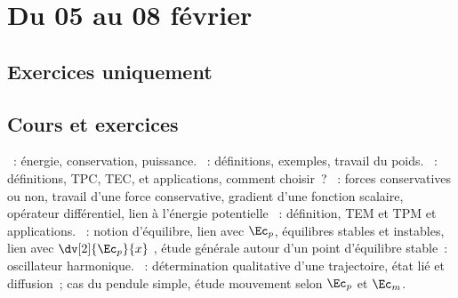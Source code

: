 \documentclass[a4paper, 12pt, final, garamond]{book}
\begin{document}
\setcounter{chapter}{16}

\chapter{Du 05 au 08 f\'evrier}

\section{Exercices uniquement}


\section{Cours et exercices}
\begin{enumerate}[label=\Roman*]
	~: énergie, conservation, puissance.
	~: définitions,
	exemples, travail du poids.
	~: définitions, TPC,
	TEC, et applications, comment choisir~?
	~: forces conservatives ou
	non, travail d'une force conservative, gradient d'une fonction scalaire,
	opérateur différentiel, lien à l'énergie potentielle
	~: définition, TEM et TPM et applications.
	~: notion d'équilibre, lien
	avec $\Ec_p$, équilibres stables et instables, lien avec
	$\dv[2]{\Ec_p}{x}$ , étude générale autour d'un point d'équilibre
	stable~: oscillateur harmonique.
	~: détermination
	qualitative d'une trajectoire, état lié et diffusion~; cas du pendule
	simple, étude mouvement selon $\Ec_p$ et $\Ec_m$.
\end{enumerate}
\end{document}
